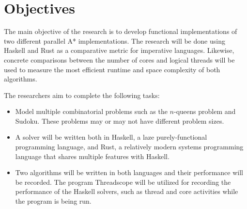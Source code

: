 \section{Objectives}
The main objective of the research is to develop functional implementations of two different
parallel A* implementations. The research will be done using Haskell and Rust as a comparative metric for
imperative languages. Likewise, concrete comparisons between the number of cores and logical threads will be 
used to measure the most efficient runtime and space complexity of both algorithms.

The researchers aim to complete the following tasks:
\begin{itemize}
    \item Model multiple combinatorial problems such as the $n$-queens problem and Sudoku. These problems 
        may or may not have different problem sizes.
    \item A solver will be written both in Haskell, a laze purely-functional programming language, and Rust, 
        a relatively modern systems programming language that shares multiple features with Haskell.
    \item Two algorithms will be written in both languages and their performance will be recorded. The program
        Threadscope will be utilized for recording the performance of the Haskell solvers, such as thread and core 
        activities while the program is being run.
\end{itemize}


